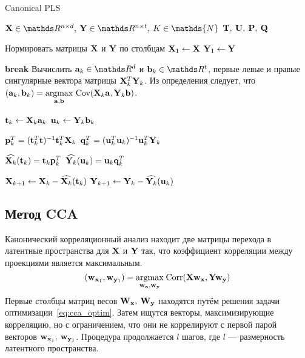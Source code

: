 \documentclass[a4paper, 12pt]{article}
\begin{document}
\begin{algorithm}[bhtp]
	\caption{Canonical PLS}\label{alg:pls}
	\begin{algorithmic}
		\Require $\bX \in \dR^{n \times d}, \: \bY \in \dR^{n \times t}, \: K \in \mathds{N}$
		\Ensure $\mathbf{T}, \: \mathbf{U}, \: \mathbf{P}, \: \mathbf{Q}$
		
		\State Нормировать матрицы $\mathbf{X}$ и $\mathbf{Y}$ по столбцам
		\State $\mathbf{X}_1 \gets \mathbf{X}$
		\State $\mathbf{Y}_1 \gets \mathbf{Y}$

				\State \textbf{break}
			\EndIf
			\State Вычислить $\ba_k \in \dR^d$ и $\bb_k \in \dR^t$, первые
			\State левые и правые сингулярные вектора матрицы $\mathbf{X}_k^T \mathbf{Y}_k$.
			\State Из определения следует, что $(\mathbf{a}_k, \mathbf{b}_k) = \underset{\mathbf{a}, \mathbf{b}}{\text{argmax}} \text{ Cov} (\mathbf{X}_k \mathbf{a}, \mathbf{Y}_k \mathbf{b})$.
			
			\State $\mathbf{t}_k \gets \mathbf{X}_k \mathbf{a}_k$
			\State $\mathbf{u}_k \gets \mathbf{Y}_k \mathbf{b}_k$
			
			\State $\mathbf{p}_k^T = (\mathbf{t}_k^T \mathbf{t})^{-1} \mathbf{t}_k^T \mathbf{X}_k$
			\State $\mathbf{q}_k^T = (\mathbf{u}_k^T \mathbf{u}_k)^{-1} \mathbf{u}_k^T \mathbf{Y}_k$
			
			\State $\widehat{\mathbf{X}_k}(\mathbf{t}_k) = \mathbf{t}_k \mathbf{p}_k^T$
			\State $\widehat{\mathbf{Y}_k}(\mathbf{u}_k) = \mathbf{u}_k \mathbf{q}_k^T$
			
			\State $\mathbf{X}_{k+1} \gets \mathbf{X}_k - \widehat{\mathbf{X}_k}(\mathbf{t}_k)$
			\State $\mathbf{Y}_{k+1} \gets \mathbf{Y}_k - \widehat{\mathbf{Y}_k}(\mathbf{u}_k)$
		\EndFor
	\end{algorithmic}
\end{algorithm}

\subsection{Метод CCA}
Канонический корреляционный анализ находит две матрицы перехода в латентные пространства для $\mathbf{X}$ и $\mathbf{Y}$ так, что коэффициент корреляции между проекциями является максимальным.
\begin{equation} \label{eq:cca_optim}
	(\mathbf{w}_{\mathbf{x}_1}, \mathbf{w}_{\mathbf{y}_1}) = \underset{\mathbf{w}_{\mathbf{x}}, \mathbf{w}_{\mathbf{y}}}{\text{argmax}}\; \text{Corr}(\mathbf{X}\mathbf{w}_{\mathbf{x}}, \mathbf{Y}\mathbf{w}_{\mathbf{y}})
\end{equation}
Первые столбцы матриц весов $\mathbf{W}_{\mathbf{x}}, \: \mathbf{W}_{\mathbf{y}}$ находятся путём решения задачи оптимизации~\eqref{eq:cca_optim}. 
Затем ищутся векторы, максимизирующие корреляцию, но с ограничением, что они не коррелируют с первой парой векторов $\mathbf{w}_{\mathbf{x}_1}, \: \mathbf{w}_{\mathbf{y}_1}$.
Процедура продолжается $l$ шагов, где $l$ --- размерность латентного пространства.
\end{document}

